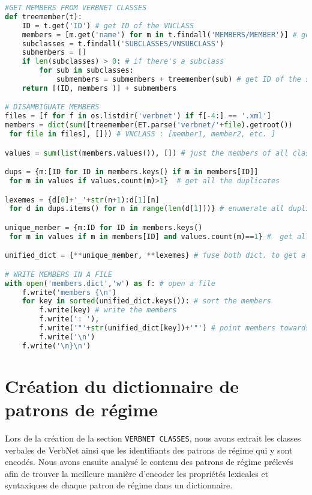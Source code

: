 \begin{lstlisting}[language=Python, caption = Importation des verbes de VerbNet, label=scriptmember]
#GET MEMBERS FROM VERBNET CLASSES
def treemember(t):
    ID = t.get('ID') # get ID of the VNCLASS
    members = [m.get('name') for m in t.findall('MEMBERS/MEMBER')] # get members 
    subclasses = t.findall('SUBCLASSES/VNSUBCLASS')
    submembers = []
    if len(subclasses) > 0: # if there's a subclass
        for sub in subclasses:
            submembers = submembers + treemember(sub) # get ID of the subclass and members
    return [(ID, members )] + submembers

# DISAMBIGUATE MEMBERS
files = [f for f in os.listdir('verbnet') if f[-4:] == '.xml']
members = dict(sum([treemember(ET.parse('verbnet/'+file).getroot())
 for file in files], [])) # VNCLASS : [member1, member2, etc. ]

values = sum(list(members.values()), []) # just the members of all classes

dups = {m:[ID for ID in members.keys() if m in members[ID]]
 for m in values if values.count(m)>1}  # get all the duplicates

lexemes = {d[0]+'_'+str(n+1):d[1][n]
 for d in dups.items() for n in range(len(d[1]))} # enumerate all duplicates: eat_1, eat_2

unique_member = {m:ID for ID in members.keys() 
 for m in values if m in members[ID] and values.count(m)==1} #  get all unique lexemes

unified_dict = {**unique_member, **lexemes} # fuse both dict. to get all members disambiguated

# WRITE MEMBERS IN A FILE
with open('members.dict','w') as f: # open a file
    f.write('members {\n')
    for key in sorted(unified_dict.keys()): # sort the members
        f.write(key) # write the members
        f.write(': '),
        f.write('"'+str(unified_dict[key])+'"') # point members towards ID of VNCLASS
        f.write('\n')
    f.write('\n}\n')
\end{lstlisting}

\section{Création du dictionnaire de patrons de régime}\label{sec:creategpcon}

Lors de la création de la section \texttt{VERBNET CLASSES}, nous avons extrait les classes verbales de VerbNet ainsi que les identifiants des patrons de régime qui y sont encodés. Nous avons ensuite analysé le contenu des patrons de régime prélevés afin de trouver la meilleure manière d'encoder les propriétés lexicales et syntaxiques de chaque patron de régime dans un dictionnaire.

